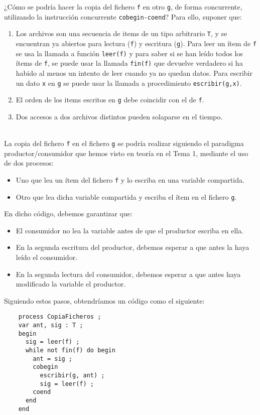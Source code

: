 \begin{ejercicio}
    ¿Cómo se podría hacer la copia del fichero \verb|f| en otro \verb|g|, de forma concurrente, utilizando la
    instrucción concurrente \verb|cobegin-coend|? Para ello, suponer que:
    \begin{enumerate}
        \item Los archivos son una secuencia de items de un tipo arbitrario \verb|T|, y se encuentran ya abiertos
        para lectura (\verb|f|) y escritura (\verb|g|). Para leer un ítem de \verb|f| se usa la llamada a función \verb|leer(f)| y
        para saber si se han leído todos los ítems de \verb|f|, se puede usar la llamada \verb|fin(f)| que devuelve
        verdadero si ha habido al menos un intento de leer cuando ya no quedan datos. Para
        escribir un dato \verb|x| en \verb|g| se puede usar la llamada a procedimiento \verb|escribir(g,x)|.

        \item El orden de los items escritos en \verb|g| debe coincidir con el de \verb|f|.
        \item Dos accesos a dos archivos distintos pueden solaparse en el tiempo.
    \end{enumerate}~\\

\noindent
La copia del fichero \verb|f| en el fichero \verb|g| se podría realizar siguiendo el paradigma productor/consumidor que hemos visto en teoría en el Tema 1, mediante el uso de dos procesos:
\begin{itemize}
    \item Uno que lea un ítem del fichero \verb|f| y lo escriba en una variable compartida.
    \item Otro que lea dicha variable compartida y escriba el ítem en el fichero \verb|g|.
\end{itemize}
En dicho código, debemos garantizar que:
\begin{itemize}
    \item El consumidor no lea la variable antes de que el productor escriba en ella.
    \item En la segunda escritura del productor, debemos esperar a que antes la haya leído el consumidor.
    \item En la segunda lectura del consumidor, debemos esperar a que antes haya modificado la variable el productor.
\end{itemize}
Siguiendo estos pasos, obtendríamos un código como el siguiente:
\begin{verbatim}
    process CopiaFicheros ;
    var ant, sig : T ;
    begin
      sig = leer(f) ;
      while not fin(f) do begin
        ant = sig ;
        cobegin
          escribir(g, ant) ;
          sig = leer(f) ;
        coend
      end
    end
\end{verbatim}


\end{ejercicio}

